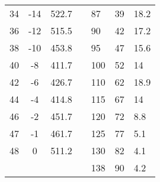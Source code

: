 \begin{table}[!htb]
\begin{tabular}{cccl|l|l|l|}
\multicolumn{1}{|c|}{34} & \multicolumn{1}{c|}{-14} & \multicolumn{1}{c|}{522.7} &  & 87 & 39 & 18.2 \\ \cline{1-3} \cline{5-7} 
\multicolumn{1}{|c|}{36} & \multicolumn{1}{c|}{-12} & \multicolumn{1}{c|}{515.5} &  & 90 & 42 & 17.2 \\ \cline{1-3} \cline{5-7} 
\multicolumn{1}{|c|}{38} & \multicolumn{1}{c|}{-10} & \multicolumn{1}{c|}{453.8} &  & 95 & 47 & 15.6 \\ \cline{1-3} \cline{5-7} 
\multicolumn{1}{|c|}{40} & \multicolumn{1}{c|}{-8} & \multicolumn{1}{c|}{411.7} &  & 100 & 52 & 14 \\ \cline{1-3} \cline{5-7} 
\multicolumn{1}{|c|}{42} & \multicolumn{1}{c|}{-6} & \multicolumn{1}{c|}{426.7} &  & 110 & 62 & 18.9 \\ \cline{1-3} \cline{5-7} 
\multicolumn{1}{|c|}{44} & \multicolumn{1}{c|}{-4} & \multicolumn{1}{c|}{414.8} &  & 115 & 67 & 14 \\ \cline{1-3} \cline{5-7} 
\multicolumn{1}{|c|}{46} & \multicolumn{1}{c|}{-2} & \multicolumn{1}{c|}{451.7} &  & 120 & 72 & 8.8 \\ \cline{1-3} \cline{5-7} 
\multicolumn{1}{|c|}{47} & \multicolumn{1}{c|}{-1} & \multicolumn{1}{c|}{461.7} &  & 125 & 77 & 5.1 \\ \cline{1-3} \cline{5-7} 
\multicolumn{1}{|c|}{48} & \multicolumn{1}{c|}{0} & \multicolumn{1}{c|}{511.2} &  & 130 & 82 & 4.1 \\ \cline{1-3} \cline{5-7} 
 &  &  &  & 138 & 90 & 4.2 \\ \cline{5-7} 
\end{tabular}
\end{table}


\newpage
